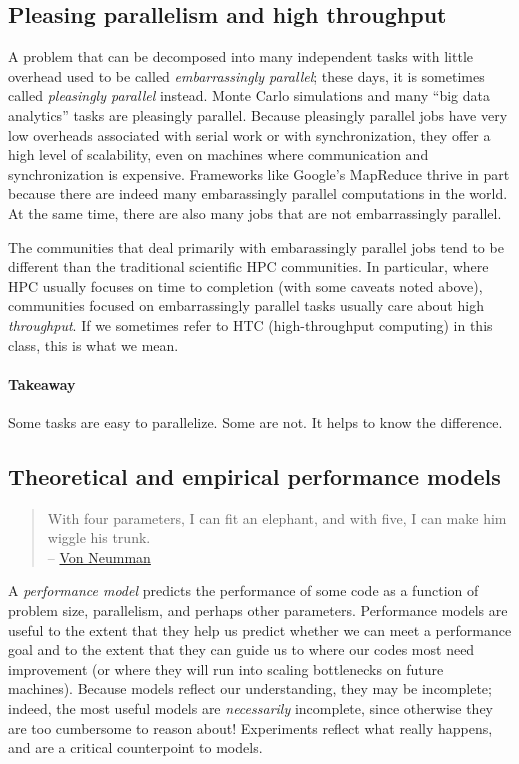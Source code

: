 \documentclass[12pt, leqno]{article} %
\begin{document}
\subsection{Pleasing parallelism and high throughput}

A problem that can be decomposed into many independent tasks with little
overhead used to be called \emph{embarrassingly parallel}; these days,
it is sometimes called \emph{pleasingly parallel} instead. Monte Carlo
simulations and many ``big data analytics'' tasks are pleasingly
parallel. Because pleasingly parallel jobs have very low overheads
associated with serial work or with synchronization, they offer a high
level of scalability, even on machines where communication and
synchronization is expensive. Frameworks like Google's MapReduce thrive
in part because there are indeed many embarassingly parallel
computations in the world. At the same time, there are also many jobs
that are not embarrassingly parallel.

The communities that deal primarily with embarassingly parallel jobs
tend to be different than the traditional scientific HPC communities. In
particular, where HPC usually focuses on time to completion (with some
caveats noted above), communities focused on embarrassingly parallel
tasks usually care about high \emph{throughput}. If we sometimes refer
to HTC (high-throughput computing) in this class, this is what we mean.

\paragraph{Takeaway}

Some tasks are easy to parallelize. Some are not. It helps to know the
difference.

\subsection{Theoretical and empirical performance models}

\begin{quote}
With four parameters, I can fit an elephant, and with five, I can make
him wiggle his trunk.\\--
\href{https://en.wikiquote.org/wiki/John_von_Neumann}{Von Neumman}
\end{quote}

A \emph{performance model} predicts the performance of some code as a
function of problem size, parallelism, and perhaps other parameters.
Performance models are useful to the extent that they help us predict
whether we can meet a performance goal and to the extent that they can
guide us to where our codes most need improvement (or where they will
run into scaling bottlenecks on future machines). Because models reflect
our understanding, they may be incomplete; indeed, the most useful
models are \emph{necessarily} incomplete, since otherwise they are too
cumbersome to reason about! Experiments reflect what really happens, and
are a critical counterpoint to models.
\end{document}
